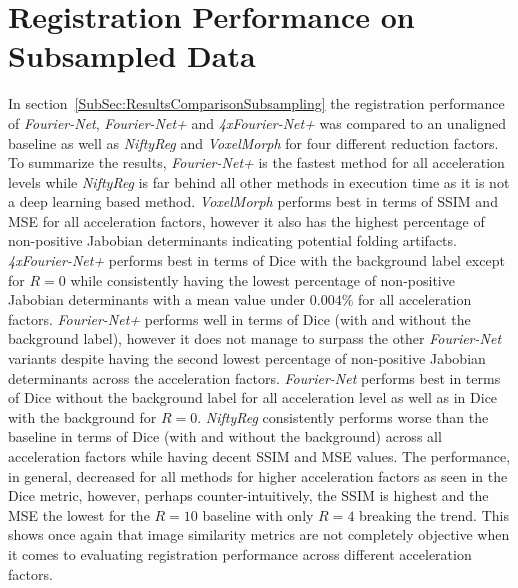 \section{Registration Performance on Subsampled Data} \label{SubSubSec:DiscussionComparisonSubsampling}
In section~\ref{SubSec:ResultsComparisonSubsampling} the registration performance of \emph{Fourier-Net}, \emph{Fourier-Net+} and \emph{4xFourier-Net+} was compared to an unaligned baseline as well as \emph{NiftyReg} and \emph{VoxelMorph} for four different reduction factors. To summarize the results, \emph{Fourier-Net+} is the fastest method for all acceleration levels while \emph{NiftyReg} is far behind all other methods in execution time as it is not a deep learning based method. \emph{VoxelMorph} performs best in terms of SSIM and MSE for all acceleration factors, however it also has the highest percentage of non-positive Jabobian determinants indicating potential folding artifacts. \emph{4xFourier-Net+} performs best in terms of Dice with the background label except for $R=0$ while consistently having the lowest percentage of non-positive Jabobian determinants with a mean value under $0.004\%$ for all acceleration factors. \emph{Fourier-Net+} performs well in terms of Dice (with and without the background label), however it does not manage to surpass the other \emph{Fourier-Net} variants despite having the second lowest percentage of non-positive Jabobian determinants across the acceleration factors. \emph{Fourier-Net} performs best in terms of Dice without the background label for all acceleration level as well as in Dice with the background for $R=0$. \emph{NiftyReg} consistently performs worse than the baseline in terms of Dice (with and without the background) across all acceleration factors while having decent SSIM and MSE values. The performance, in general, decreased for all methods for higher acceleration factors as seen in the Dice metric, however, perhaps counter-intuitively, the SSIM is highest and the MSE the lowest for the $R=10$ baseline with only $R=4$ breaking the trend. This shows once again that image similarity metrics are not completely objective when it comes to evaluating registration performance across different acceleration factors.

